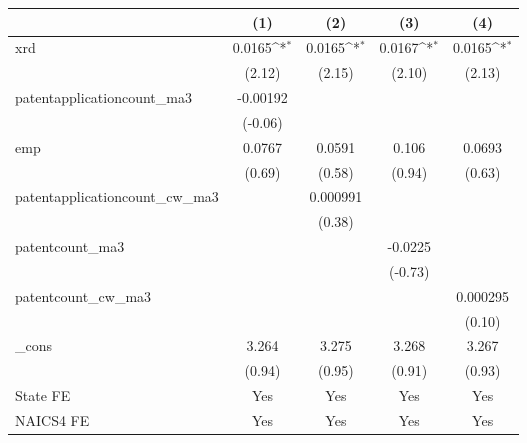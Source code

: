 {
\def\sym#1{\ifmmode^{#1}\else\(^{#1}\)\fi}
\begin{tabular}{l*{4}{c}}
\hline\hline
            &\multicolumn{1}{c}{(1)}         &\multicolumn{1}{c}{(2)}         &\multicolumn{1}{c}{(3)}         &\multicolumn{1}{c}{(4)}         \\
\hline
xrd         &      0.0165\sym{*}  &      0.0165\sym{*}  &      0.0167\sym{*}  &      0.0165\sym{*}  \\
            &      (2.12)         &      (2.15)         &      (2.10)         &      (2.13)         \\
[1em]
patentapplicationcount\_ma3&    -0.00192         &                     &                     &                     \\
            &     (-0.06)         &                     &                     &                     \\
[1em]
emp         &      0.0767         &      0.0591         &       0.106         &      0.0693         \\
            &      (0.69)         &      (0.58)         &      (0.94)         &      (0.63)         \\
[1em]
patentapplicationcount\_cw\_ma3&                     &    0.000991         &                     &                     \\
            &                     &      (0.38)         &                     &                     \\
[1em]
patentcount\_ma3&                     &                     &     -0.0225         &                     \\
            &                     &                     &     (-0.73)         &                     \\
[1em]
patentcount\_cw\_ma3&                     &                     &                     &    0.000295         \\
            &                     &                     &                     &      (0.10)         \\
[1em]
\_cons      &       3.264         &       3.275         &       3.268         &       3.267         \\
            &      (0.94)         &      (0.95)         &      (0.91)         &      (0.93)         \\
[1em]
State FE    &         Yes         &         Yes         &         Yes         &         Yes         \\
[1em]
NAICS4 FE   &         Yes         &         Yes         &         Yes         &         Yes         \\

\end{tabular}}
